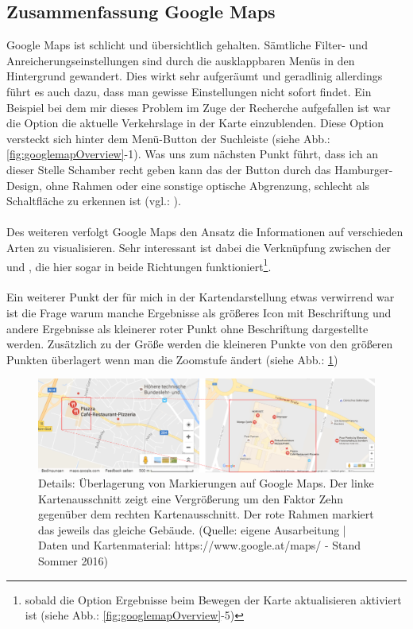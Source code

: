 \documentclass[../Bachelorarbeit.tex]{subfiles}
\begin{document}
\subsection{Zusammenfassung Google Maps}
Google Maps ist schlicht und übersichtlich gehalten.
Sämtliche Filter- und Anreicherungseinstellungen sind durch die ausklappbaren Menüs in den Hintergrund gewandert.
Dies wirkt sehr aufgeräumt und geradlinig allerdings führt es auch dazu, dass man gewisse Einstellungen nicht sofort findet.
Ein Beispiel bei dem mir dieses Problem im Zuge der Recherche aufgefallen ist war die Option die aktuelle Verkehrslage in der Karte einzublenden.
Diese Option versteckt sich hinter dem Menü-Button der Suchleiste (siehe Abb.: \ref{fig:googlemapOverview}-1). 
Was uns zum nächsten Punkt führt, dass ich an dieser Stelle Schamber recht geben kann das der Button durch das Hamburger-Design, ohne Rahmen oder eine sonstige optische Abgrenzung, schlecht als Schaltfläche zu erkennen ist (vgl.: \cite{SchamberHamburgerIcon}).\\
\\
Des weiteren verfolgt Google Maps den Ansatz die Informationen auf verschieden Arten zu visualisieren. 
Sehr interessant ist dabei die Verknüpfung zwischen der  und , die hier sogar in beide Richtungen funktioniert\footnote{sobald die Option Ergebnisse beim Bewegen der Karte aktualisieren aktiviert ist (siehe Abb.: \ref{fig:googlemapOverview}-5)}.\\
\\
Ein weiterer Punkt der für mich in der Kartendarstellung etwas verwirrend war ist die Frage warum manche Ergebnisse als größeres Icon mit Beschriftung und andere Ergebnisse als kleinerer roter Punkt ohne Beschriftung dargestellte werden. 
Zusätzlich zu der Größe werden die kleineren Punkte von den größeren Punkten überlagert wenn man die Zoomstufe ändert (siehe Abb.: \ref{fig:googlemapDetail})


\begin{figure}[H]
\centering
\includegraphics[width=1\linewidth]{img/StandDerTechnik/googlemapDetail}
\caption[Details: Überlagerung von Markierungen auf Google Maps]{Details: Überlagerung von Markierungen auf Google Maps. Der linke Kartenausschnitt zeigt eine Vergrößerung um den Faktor Zehn gegenüber dem rechten Kartenausschnitt. Der rote Rahmen markiert das jeweils das gleiche Gebäude. (Quelle: eigene Ausarbeitung | Daten und Kartenmaterial: https://www.google.at/maps/ - Stand Sommer 2016)}
\label{fig:googlemapDetail}
\end{figure}
\end{document}

